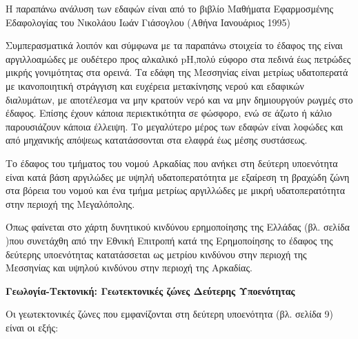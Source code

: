 \documentclass[12pt]{article}
\newcommand{\gr}{\selectlanguage{greek}}
\newcommand{\eng}{\selectlanguage{english}}
\begin{document}
	Η παραπάνω ανάλυση των εδαφών είναι από το βιβλίο Μαθήματα Εφαρμοσμένης Εδαφολογίας του Νικολάου Ιωάν Γιάσογλου (Αθήνα  Ιανουάριος 1995)
	
	Συμπερασματικά λοιπόν και σύμφωνα με τα παραπάνω στοιχεία το έδαφος της  είναι αργιλλοαμώδες με ουδέτερο προς αλκαλικό \eng pH,\gr πολύ εύφορο στα πεδινά έως πετρώδες μικρής γονιμότητας στα ορεινά. Τα εδάφη της Μεσσηνίας είναι μετρίως υδατοπερατά με ικανοποιητική στράγγιση και ευχέρεια μετακίνησης νερού και εδαφικών διαλυμάτων, με αποτέλεσμα να μην κρατούν νερό και να μην δημιουργούν ρωγμές στο έδαφος. Επίσης έχουν κάποια περιεκτικότητα σε φώσφορο, ενώ σε άζωτο ή κάλιο παρουσιάζουν κάποια έλλειψη. Το μεγαλύτερο μέρος των εδαφών είναι λοφώδες και από μηχανικής απόψεως κατατάσσονται στα ελαφρά έως μέσης συστάσεως.
	
	Το έδαφος του τμήματος του νομού Αρκαδίας που ανήκει στη δεύτερη υποενότητα είναι κατά βάση αργιλώδες με υψηλή υδατοπερατότητα με εξαίρεση τη βραχώδη ζώνη στα βόρεια του νομού και ένα τμήμα μετρίως αργιλλώδες με μικρή υδατοπερατότητα στην περιοχή της Μεγαλόπολης.
	
	Όπως φαίνεται στο χάρτη δυνητικού κινδύνου ερημοποίησης της Ελλάδας (βλ. σελίδα \pageref{erimopoiisi})που συνετάχθη από την Εθνική Επιτροπή κατά της Ερημοποίησης το έδαφος της δεύτερης υποενότητας κατατάσσεται ως μετρίου κινδύνου στην περιοχή της Μεσσηνίας και υψηλού κινδύνου στην περιοχή της Αρκαδίας.
	
	\textbf{Γεωλογία-Τεκτονική: Γεωτεκτονικές ζώνες Δεύτερης Υποενότητας}
	
	Οι γεωτεκτονικές ζώνες που εμφανίζονται στη δεύτερη υποενότητα (βλ. σελίδα 9\pageref{geotektonikes}) είναι οι εξής:
	
\end{document}
